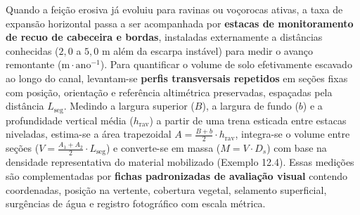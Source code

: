 Quando a feição erosiva já evoluiu para ravinas ou voçorocas ativas, a taxa de expansão horizontal passa a ser acompanhada por \textbf{estacas de monitoramento de recuo de cabeceira e bordas}, instaladas externamente a distâncias conhecidas ($2{,}0$ a $5{,}0\text{ m}$ além da escarpa instável) para medir o avanço remontante ($\text{m}\cdot\text{ano}^{-1}$). Para quantificar o volume de solo efetivamente escavado ao longo do canal, levantam-se \textbf{perfis transversais repetidos} em seções fixas com posição, orientação e referência altimétrica preservadas, espaçadas pela distância $L_{\text{seg}}$. Medindo a largura superior ($B$), a largura de fundo ($b$) e a profundidade vertical média ($h_{\text{rav}}$) a partir de uma trena esticada entre estacas niveladas, estima-se a área trapezoidal $A = \frac{B + b}{2}\cdot h_{\text{rav}}$, integra-se o volume entre seções ($V = \frac{A_1 + A_2}{2}\cdot L_{\text{seg}}$) e converte-se em massa ($M = V \cdot D_s$) com base na densidade representativa do material mobilizado (Exemplo 12.4). Essas medições são complementadas por \textbf{fichas padronizadas de avaliação visual} contendo coordenadas, posição na vertente, cobertura vegetal, selamento superficial, surgências de água e registro fotográfico com escala métrica.


